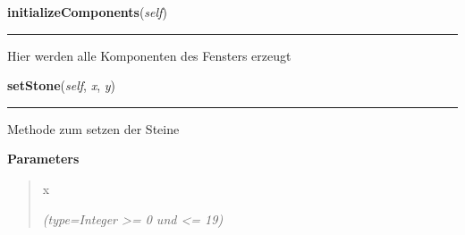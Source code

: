     \label{Main:main:mainGUI:initializeComponents}

    \vspace{0.5ex}

\hspace{.8\funcindent}\begin{boxedminipage}{\funcwidth}

    \raggedright \textbf{initializeComponents}(\textit{self})

    \vspace{-1.5ex}

    \rule{\textwidth}{0.5\fboxrule}
\setlength{\parskip}{2ex}
    Hier werden alle Komponenten des Fensters erzeugt

\setlength{\parskip}{1ex}
    \end{boxedminipage}

    \label{Main:main:mainGUI:setStone}

    \vspace{0.5ex}

\hspace{.8\funcindent}\begin{boxedminipage}{\funcwidth}

    \raggedright \textbf{setStone}(\textit{self}, \textit{x}, \textit{y})

    \vspace{-1.5ex}

    \rule{\textwidth}{0.5\fboxrule}
\setlength{\parskip}{2ex}
    Methode zum setzen der Steine

\setlength{\parskip}{1ex}
      \textbf{Parameters}
      \vspace{-1ex}

      \begin{quote}
        \begin{Ventry}{x}

          \item[x]

            {\it (type=Integer {\textgreater}= 0 und {\textless}= 19)}

        \end{Ventry}

      \end{quote}

    \end{boxedminipage}

